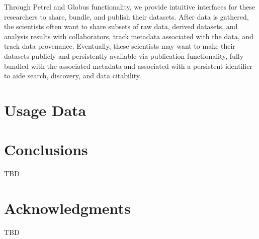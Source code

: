 \documentclass[sigconf]{acmart}
\begin{document}
Through Petrel and Globus functionality, we provide intuitive interfaces for these researchers to share, bundle, and publish their datasets. After data is gathered, the scientists often want to share subsets of raw data, derived datasets, and analysis results with collaborators, track metadata associated with the data, and track data provenance. Eventually, these scientists may want to make their datasets publicly and persistently available via publication functionality, fully bundled with the associated metadata and associated with a persistent identifier to aide search, discovery, and data citability.

\section{Usage Data}






\section{Conclusions}
TBD



\section*{Acknowledgments}

TBD



 
\end{document}
